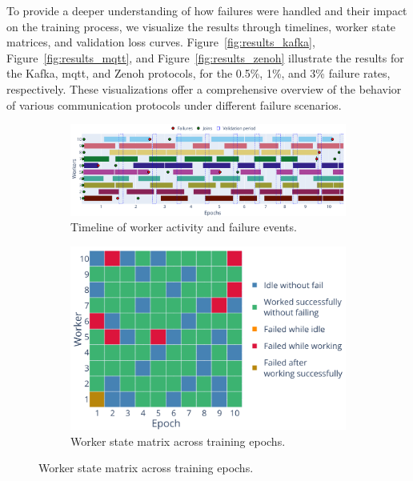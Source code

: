 To provide a deeper understanding of how failures were handled and their impact on the training process, we visualize the results through timelines, worker state matrices, and validation loss curves. Figure~\ref{fig:results_kafka}, Figure~\ref{fig:results_mqtt}, and Figure~\ref{fig:results_zenoh} illustrate the results for the Kafka, \ac{mqtt}, and Zenoh protocols, for the 0.5\%, 1\%, and 3\% failure rates, respectively. These visualizations offer a comprehensive overview of the behavior of various communication protocols under different failure scenarios.

\begin{figure}[!htb]
    \centering
    \begin{subfigure}[b]{\linewidth}
        \centering
        \includegraphics[width=\linewidth]{figs/scenario2/kafka_timeline.pdf}
        \caption{Timeline of worker activity and failure events.}
        \label{fig:timeline_kafka}
    \end{subfigure}
    \begin{subfigure}[b]{0.6\linewidth}
        \centering
        \includegraphics[width=\linewidth]{figs/scenario2/kafka_status.pdf}
        \caption{Worker state matrix across training epochs.}
        \label{fig:states_kafka}

\end{subfigure}
\end{figure}

